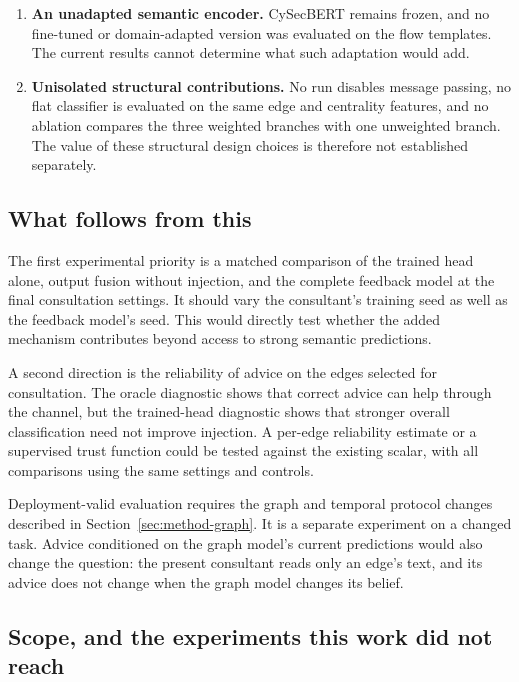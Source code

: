 \begin{enumerate}
    \item \textbf{An unadapted semantic encoder.} CySecBERT remains frozen, and no fine-tuned or domain-adapted version was evaluated on the flow templates. The current results cannot determine what such adaptation would add.

    \item \textbf{Unisolated structural contributions.} No run disables message passing, no flat classifier is evaluated on the same edge and centrality features, and no ablation compares the three weighted branches with one unweighted branch. The value of these structural design choices is therefore not established separately.
\end{enumerate}

\subsection{What follows from this}
\label{sec:disc-future}

The first experimental priority is a matched comparison of the trained head alone, output fusion without injection, and the complete feedback model at the final consultation settings. It should vary the consultant's training seed as well as the feedback model's seed. This would directly test whether the added mechanism contributes beyond access to strong semantic predictions.

A second direction is the reliability of advice on the edges selected for consultation. The oracle diagnostic shows that correct advice can help through the channel, but the trained-head diagnostic shows that stronger overall classification need not improve injection. A per-edge reliability estimate or a supervised trust function could be tested against the existing scalar, with all comparisons using the same settings and controls.

Deployment-valid evaluation requires the graph and temporal protocol changes described in Section~\ref{sec:method-graph}. It is a separate experiment on a changed task. Advice conditioned on the graph model's current predictions would also change the question: the present consultant reads only an edge's text, and its advice does not change when the graph model changes its belief.

\subsection{Scope, and the experiments this work did not reach}
\label{sec:disc-scope}

